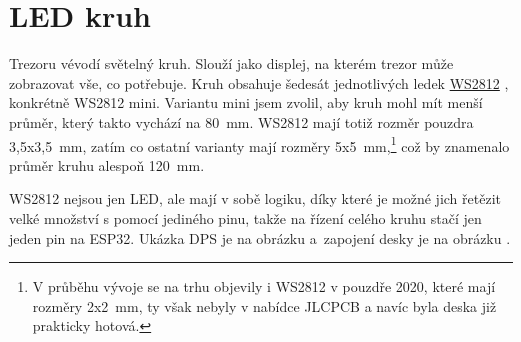 \section{LED kruh}
\label{WS2812}

Trezoru vévodí světelný kruh. Slouží jako displej, na kterém trezor může zobrazovat vše, co potřebuje. Kruh obsahuje šedesát jednotlivých ledek 
\href{https://cdn-shop.adafruit.com/datasheets/WS2812B.pdf}{WS2812} \parencite{WS2812}, konkrétně WS2812 mini. Variantu mini jsem zvolil, aby kruh mohl mít menší
průměr, který takto vychází na 80~mm. WS2812 mají totiž rozměr pouzdra 3,5x3,5~mm, zatím co ostatní varianty mají rozměry 5x5~mm,\footnote{V průběhu vývoje se na trhu 
objevily i WS2812 v pouzdře 2020, které mají rozměry 2x2~mm, ty však nebyly v nabídce JLCPCB a navíc byla deska již prakticky hotová.} což by znamenalo průměr kruhu alespoň 120~mm.

WS2812 nejsou jen LED, ale mají v sobě logiku, díky které je možné jich řetězit velké množství s pomocí jediného pinu, takže na řízení celého kruhu stačí jen jeden pin na ESP32.
Ukázka DPS je na obrázku  a~zapojení desky je na obrázku .